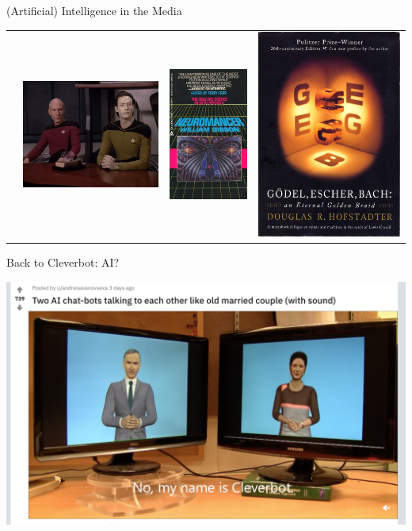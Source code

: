 \documentclass[xcolor={usenames,svgnames,x11names,dvipsnames,table}]{beamer}
\begin{document}
\begin{frame}{(Artificial) Intelligence in the Media}
\begin{center}
\begin{tabular}{cccc}
            &
            \includegraphics[width=.2\linewidth]{./img/measureofaman}
            &
            \includegraphics[width=.2\linewidth]{./img/neuromancer}
            &
            \includegraphics[width=.2\linewidth]{./img/godelescherbach}
        \end{tabular}
    \end{center}
\end{frame}

\begin{frame}{Back to Cleverbot: AI?}
    \begin{center}
     \href{https://www.reddit.com/r/funny/comments/asga0m/two_ai_chatbots_talking_to_each_other_like_old/} {\includegraphics[width=\linewidth]{./img/cleverbotAI}}
     \end{center}
   \end{frame}
\end{document}
